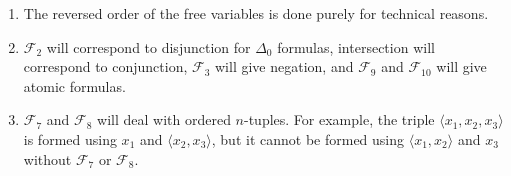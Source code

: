 \begin{remark}
    \begin{enumerate}
        \item The reversed order of the free variables is done purely for technical reasons.
        \item \( \mathcal F_2 \) will correspond to disjunction for \( \Delta_0 \) formulas, intersection will correspond to conjunction, \( \mathcal F_3 \) will give negation, and \( \mathcal F_9 \) and \( \mathcal F_{10} \) will give atomic formulas.
        \item \( \mathcal F_7 \) and \( \mathcal F_8 \) will deal with ordered \( n \)-tuples.
        For example, the triple \( \langle x_1, x_2, x_3 \rangle \) is formed using \( x_1 \) and \( \langle x_2, x_3 \rangle \), but it cannot be formed using \( \langle x_1, x_2 \rangle \) and \( x_3 \) without \( \mathcal F_7 \) or \( \mathcal F_8 \).
    \end{enumerate}
\end{remark}
